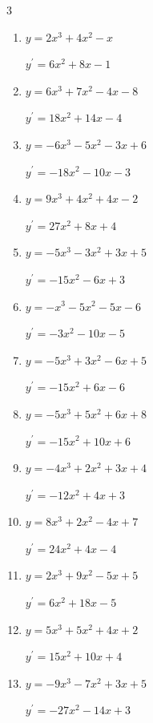 \begin{multicols}{3}
\begin{enumerate}
  \item $y=2x^{3}+4x^{2}-x$

        $\displaystyle y^{\prime}=6x^{2}+8x-1$

  \item $y=6x^{3}+7x^{2}-4x-8$

        $\displaystyle y^{\prime}=18x^{2}+14x-4$

  \item $y=-6x^{3}-5x^{2}-3x+6$

        $\displaystyle y^{\prime}=-18x^{2}-10x-3$

  \item $y=9x^{3}+4x^{2}+4x-2$

        $\displaystyle y^{\prime}=27x^{2}+8x+4$

  \item $y=-5x^{3}-3x^{2}+3x+5$

        $\displaystyle y^{\prime}=-15x^{2}-6x+3$

  \item $y=-x^{3}-5x^{2}-5x-6$

        $\displaystyle y^{\prime}=-3x^{2}-10x-5$

  \item $y=-5x^{3}+3x^{2}-6x+5$

        $\displaystyle y^{\prime}=-15x^{2}+6x-6$

  \item $y=-5x^{3}+5x^{2}+6x+8$

        $\displaystyle y^{\prime}=-15x^{2}+10x+6$

  \item $y=-4x^{3}+2x^{2}+3x+4$

        $\displaystyle y^{\prime}=-12x^{2}+4x+3$

  \item $y=8x^{3}+2x^{2}-4x+7$

        $\displaystyle y^{\prime}=24x^{2}+4x-4$

\columnbreak %

  \item $y=2x^{3}+9x^{2}-5x+5$

        $\displaystyle y^{\prime}=6x^{2}+18x-5$

  \item $y=5x^{3}+5x^{2}+4x+2$

        $\displaystyle y^{\prime}=15x^{2}+10x+4$

  \item $y=-9x^{3}-7x^{2}+3x+5$

        $\displaystyle y^{\prime}=-27x^{2}-14x+3$


\end{enumerate}
\end{multicols}
